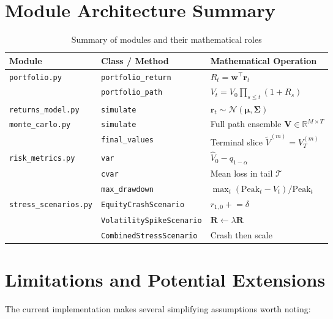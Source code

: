 \documentclass[12pt, a4paper]{article}
\begin{document}
\section{Module Architecture Summary}

\begin{table}[H]
\centering
\caption{Summary of modules and their mathematical roles}
\begin{tabular}{llp{8cm}}
\toprule
\textbf{Module} & \textbf{Class / Method} & \textbf{Mathematical Operation} \\
\midrule
\texttt{portfolio.py} & \texttt{portfolio\_return} & $R_t = \bm{w}^\top\bm{r}_t$ \\
& \texttt{portfolio\_path} & $V_t = V_0\prod_{s\leq t}(1+R_s)$ \\
\midrule
\texttt{returns\_model.py} & \texttt{simulate} & $\bm{r}_t \sim \mathcal{N}(\bm{\mu}, \bm{\Sigma})$ \\
\midrule
\texttt{monte\_carlo.py} & \texttt{simulate} & Full path ensemble $\mathbf{V} \in \mathbb{R}^{M\times T}$ \\
& \texttt{final\_values} & Terminal slice $\widetilde{V}^{(m)} = V^{(m)}_T$ \\
\midrule
\texttt{risk\_metrics.py} & \texttt{var} & $\hat{V}_0 - q_{1-\alpha}$ \\
& \texttt{cvar} & Mean loss in tail $\mathcal{T}$ \\
& \texttt{max\_drawdown} & $\max_t (\mathrm{Peak}_t - V_t)/\mathrm{Peak}_t$ \\
\midrule
\texttt{stress\_scenarios.py} & \texttt{EquityCrashScenario} & $r_{1,0} \mathrel{+}= \delta$ \\
& \texttt{VolatilitySpikeScenario} & $\mathbf{R} \leftarrow \lambda \mathbf{R}$ \\
& \texttt{CombinedStressScenario} & Crash then scale \\
\bottomrule
\end{tabular}
\end{table}

\section{Limitations and Potential Extensions}

The current implementation makes several simplifying assumptions worth noting:
\end{document}
